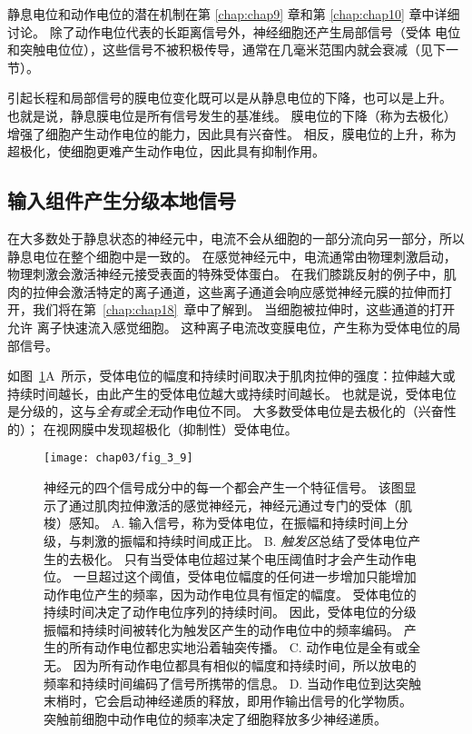 静息电位和动作电位的潜在机制在第 \ref{chap:chap9} 章和第 \ref{chap:chap10} 章中详细讨论。
除了动作电位代表的长距离信号外，神经细胞还产生局部信号（受体
电位和突触电位位），这些信号不被积极传导，通常在几毫米范围内就会衰减（见下一节）。


引起长程和局部信号的膜电位变化既可以是从静息电位的下降，也可以是上升。
也就是说，静息膜电位是所有信号发生的基准线。 
膜电位的下降（称为去极化）增强了细胞产生动作电位的能力，因此具有兴奋性。 
相反，膜电位的上升，称为超极化，使细胞更难产生动作电位，因此具有抑制作用。


\subsection{输入组件产生分级本地信号}
在大多数处于静息状态的神经元中，电流不会从细胞的一部分流向另一部分，所以静息电位在整个细胞中是一致的。 
在感觉神经元中，电流通常由物理刺激启动，物理刺激会激活神经元接受表面的特殊受体蛋白。 
在我们膝跳反射的例子中，肌肉的拉伸会激活特定的离子通道，这些离子通道会响应感觉神经元膜的拉伸而打开，我们将在第~\ref{chap:chap18}~章中了解到。
当细胞被拉伸时，这些通道的打开允许  离子快速流入感觉细胞。 
这种离子电流改变膜电位，产生称为受体电位的局部信号。


如图~\ref{fig:3_9}A~所示，受体电位的幅度和持续时间取决于肌肉拉伸的强度：拉伸越大或持续时间越长，由此产生的受体电位越大或持续时间越长。
也就是说，受体电位是分级的，这与\textit{全有或全无}动作电位不同。
大多数受体电位是去极化的（兴奋性的）；
在视网膜中发现超极化（抑制性）受体电位。


\begin{figure}[htbp]
	\centering
	\texttt{[image: chap03/fig\_3\_9]}
	\caption{神经元的四个信号成分中的每一个都会产生一个特征信号。
		该图显示了通过肌肉拉伸激活的感觉神经元，神经元通过专门的受体（肌梭）感知。 
		A. 输入信号，称为受体电位，在振幅和持续时间上分级，与刺激的振幅和持续时间成正比。 
		B. \textit{触发区}总结了受体电位产生的去极化。
		只有当受体电位超过某个电压阈值时才会产生动作电位。
		一旦超过这个阈值，受体电位幅度的任何进一步增加只能增加动作电位产生的频率，因为动作电位具有恒定的幅度。
		受体电位的持续时间决定了动作电位序列的持续时间。
		因此，受体电位的分级振幅和持续时间被转化为触发区产生的动作电位中的频率编码。
		产生的所有动作电位都忠实地沿着轴突传播。
		C. 动作电位是全有或全无。
		因为所有动作电位都具有相似的幅度和持续时间，所以放电的频率和持续时间编码了信号所携带的信息。
		D. 当动作电位到达突触末梢时，它会启动神经递质的释放，即用作输出信号的化学物质。
		突触前细胞中动作电位的频率决定了细胞释放多少神经递质。}
	\label{fig:3_9}
\end{figure}


